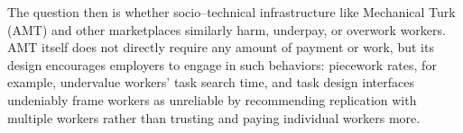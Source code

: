 \documentclass[11pt]{article}
\begin{document}
The question then is
whether socio--technical infrastructure like Mechanical Turk (AMT)
and other marketplaces
similarly harm, underpay, or overwork workers.
AMT itself does not directly require any amount of payment or work,
but its design encourages employers to engage in such behaviors:
piecework rates, for example, undervalue workers' task search time, and
task design interfaces undeniably frame
workers as unreliable by recommending
replication with multiple workers rather than
trusting and paying individual workers more.








\end{document}
